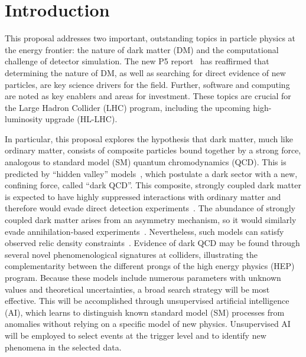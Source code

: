 \section{Introduction}\label{sec:intro}

This proposal addresses two important, outstanding topics in particle physics at the energy frontier:
the nature of dark matter (DM) and the computational challenge of detector simulation.
The new P5 report~\cite{P5:2023} has reaffirmed that determining the nature of DM,
as well as searching for direct evidence of new particles, are key science drivers for the field.
Further, software and computing are noted as key enablers and areas for investment.
These topics are crucial for the Large Hadron Collider (LHC) program,
including the upcoming high-luminosity upgrade (HL-LHC).

In particular, this proposal explores the hypothesis that dark matter, much like ordinary matter,
consists of composite particles bound together by a strong force, analogous to standard model (SM) quantum chromodynamics (QCD).
This is predicted by ``hidden valley'' models~\cite{Strassler:2006im}, which postulate a dark sector with a new, confining force, called ``dark QCD''.
This composite, strongly coupled dark matter is expected to have highly suppressed interactions with ordinary matter
and therefore would evade direct detection experiments~\cite{Cohen:2017pzm}.
The abundance of strongly coupled dark matter arises from an asymmetry mechanism, so it would similarly evade annihilation-based experiments~\cite{Petraki:2013wwa}.
Nevertheless, such models can satisfy observed relic density constraints~\cite{Beauchesne:2018myj,Beauchesne:2019ato}.
Evidence of dark QCD may be found through several novel phenomenological signatures at colliders,
illustrating the complementarity between the different prongs of the high energy physics (HEP) program.
Because these models include numerous parameters with unknown values and theoretical uncertainties, a broad search strategy will be most effective.
This will be accomplished through unsupervised artificial intelligence (AI), which learns to distinguish known standard model (SM) processes from anomalies
without relying on a specific model of new physics.
Unsupervised AI will be employed to select events at the trigger level and to identify new phenomena in the selected data.

